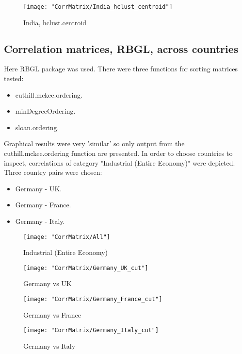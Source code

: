 \documentclass[a4paper]{article}
\begin{document}
\begin{figure}[H]
\begin{center}
\texttt{[image: "CorrMatrix/India\_hclust\_centroid"]}
\caption{India,  hclust.centroid}
\label{fig:2}
\end{center}
\end{figure}

\subsection{Correlation matrices,  RBGL,  across countries}
Here RBGL package was used. There were three functions for sorting
matrices tested:
\begin{itemize}
\item cuthill.mckee.ordering.
\item minDegreeOrdering.
\item sloan.ordering.
\end{itemize}

Graphical results were very 'similar' so only output from the cuthill.mckee.ordering function are presented. In order to choose
countries to inspect, correlations of category "Industrial (Entire
Economy)" were depicted. Three country pairs were chosen:

\begin{itemize}
\item Germany - UK.
\item Germany - France.
\item Germany - Italy.
\end{itemize}


\begin{figure}[H]
\begin{center}
\texttt{[image: "CorrMatrix/All"]}
\caption{Industrial (Entire Economy)}
\label{fig:2}
\end{center}
\end{figure}

\begin{figure}[H]
\begin{center}
\texttt{[image: "CorrMatrix/Germany\_UK\_cut"]}
\caption{Germany vs UK}
\label{fig:2}
\end{center}
\end{figure}

\begin{figure}[H]
\begin{center}
\texttt{[image: "CorrMatrix/Germany\_France\_cut"]}
\caption{Germany vs France}
\label{fig:2}
\end{center}
\end{figure}

\begin{figure}[H]
\begin{center}
\texttt{[image: "CorrMatrix/Germany\_Italy\_cut"]}
\caption{Germany vs Italy}
\label{fig:2}
\end{center}
\end{figure}
\end{document}
